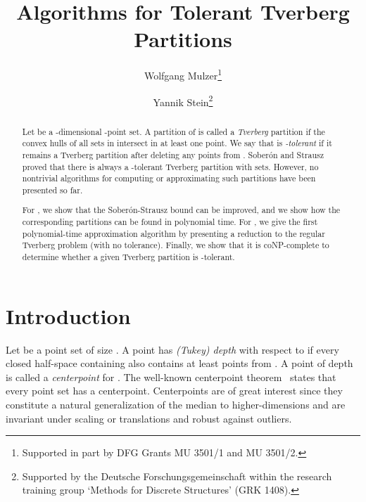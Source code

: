 \documentclass[oribibl,envcountsame,envcountsect]{llncs}
\title{Algorithms for Tolerant Tverberg Partitions}
\author{Wolfgang Mulzer\thanks{Supported in part by DFG Grants MU 3501/1 and MU 3501/2.} \and Yannik Stein\thanks{
    Supported by the Deutsche Forschungsgemeinschaft within the research
    training group `Methods for Discrete Structures' (GRK 1408).
    }
}
\institute{ Institut f\"ur Informatik, Freie Universit\"at Berlin\\
            Takustr. 9, 14195 Berlin, Germany\\
            \email{\{mulzer, yannikstein\}@inf.fu-berlin.de}
          }
\begin{document}
\maketitle

\begin{abstract}
  Let  be a -dimensional -point set. A partition  of 
  is called a \emph{Tverberg} partition if the convex hulls of all sets
  in  intersect in at least one point. We say that  is
  \emph{-tolerant} if it remains a Tverberg partition after deleting
  any  points from . Sober\'{o}n and Strausz proved that there is always a
  -tolerant Tverberg partition with  sets.
  However, no nontrivial algorithms for computing or approximating
  such partitions have been presented so far.

  For , we show that the Sober\'{o}n-Strausz bound can be improved,
  and we show how the corresponding partitions can be found in polynomial time.
  For , we give the first polynomial-time approximation algorithm
  by presenting a reduction to the regular Tverberg problem (with no
  tolerance).
  Finally, we show that it is coNP-complete to determine whether a given
  Tverberg partition is -tolerant.

\end{abstract}

\section{Introduction}
Let  be a point set of size . A point  has
\emph{(Tukey) depth}   with respect to  if every closed half-space containing
 also contains at least  points from . A point of depth  is called a \emph{centerpoint} for . The well-known centerpoint
theorem~\cite{Rado1946} states that every point set has a centerpoint. Centerpoints
are of great interest since they constitute a natural generalization of the median to
higher-dimensions and are invariant under scaling or translations
and robust against outliers.
\end{document}
